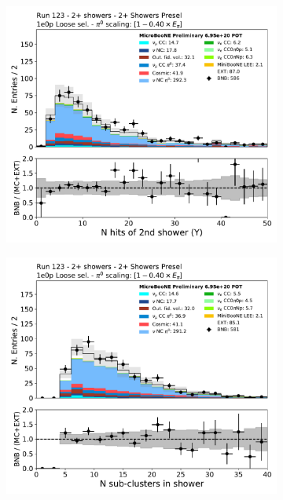 \begin{figure}[H]
    \begin{center}
    \begin{subfigure}{0.45\textwidth}
    \includegraphics[width=1.00\textwidth]{Sidebands/Figures/TwoShr_1e0pSel_newSamples/secondshower_Y_nhit_loose.pdf}
    \end{subfigure}
    \begin{subfigure}{0.45\textwidth}
    \includegraphics[width=1.00\textwidth]{Sidebands/Figures/TwoShr_1e0pSel_newSamples/subcluster_loose.pdf}

\end{subfigure}
\end{center}
\end{figure}
